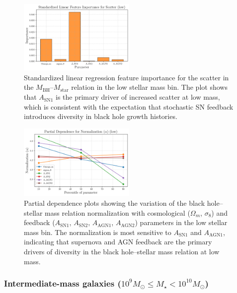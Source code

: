 \documentclass[twocolumn]{aastex631}
\begin{document}
\begin{figure}[ht!]
    \centering
    \includegraphics[width=0.5\textwidth]{plots/featimp_StandardizedLinear_Scatter_low_34_20250423_182540.png}
    \caption{Standardized linear regression feature importance for the scatter in the $M_\mathrm{BH}$--$M_\mathrm{star}$ relation in the low stellar mass bin. The plot shows that $A_\mathrm{SN1}$ is the primary driver of increased scatter at low mass, which is consistent with the expectation that stochastic SN feedback introduces diversity in black hole growth histories.
}
    \label{fig:featimp_scatter_low}
\end{figure}

\begin{figure}[ht!]
    \centering
    \includegraphics[width=0.5\textwidth]{plots/pdp_Normalization_alpha_low_32_20250423_182539.png}
    \caption{Partial dependence plots showing the variation of the black hole--stellar mass relation normalization with cosmological ($\Omega_m$, $\sigma_8$) and feedback ($A_\mathrm{SN1}$, $A_\mathrm{SN2}$, $A_\mathrm{AGN1}$, $A_\mathrm{AGN2}$) parameters in the low stellar mass bin. The normalization is most sensitive to $A_\mathrm{SN1}$ and $A_\mathrm{AGN1}$, indicating that supernova and AGN feedback are the primary drivers of diversity in the black hole--stellar mass relation at low mass.
}
    \label{fig:pdp_norm_low}
\end{figure}

\subsubsection{Intermediate-mass galaxies ($10^9 M_{\odot} \leq M_{\star} < 10^{10} M_{\odot}$)}
\end{document}

